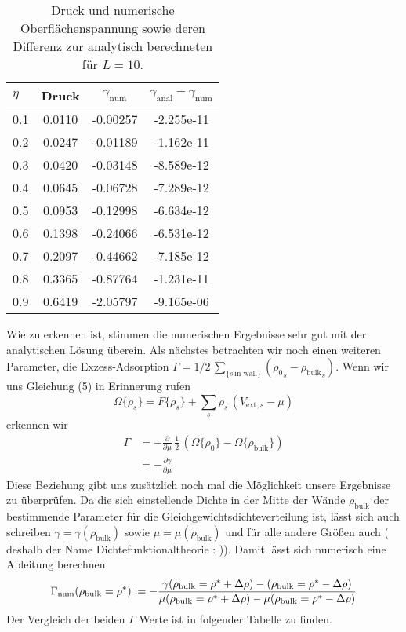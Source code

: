 \documentclass[12pt]{article}
\begin{document}
\begin{table}[H]\centering\begin{tabular}{l | c | c | c}
$\eta$&Druck&$\gamma_\text{num}$&$\gamma_\text{anal}-\gamma_\text{num}$\\\hline\hline
0.1&0.0110&-0.00257&-2.255e-11\\
0.2&0.0247&-0.01189&-1.162e-11\\
0.3&0.0420&-0.03148&-8.589e-12\\
0.4&0.0645&-0.06728&-7.289e-12\\
0.5&0.0953&-0.12998&-6.634e-12\\
0.6&0.1398&-0.24066&-6.531e-12\\
0.7&0.2097&-0.44662&-7.185e-12\\
0.8&0.3365&-0.87764&-1.231e-11\\
0.9&0.6419&-2.05797&-9.165e-06
\end{tabular}\caption{Druck und numerische Oberflächenspannung sowie deren Differenz zur analytisch berechneten für $L=10$.}\end{table}
Wie zu erkennen ist, stimmen die numerischen Ergebnisse sehr gut mit der analytischen Lösung überein.\newline\newline
Als nächstes betrachten wir noch einen weiteren Parameter, die Exzess-Adsorption $\Gamma=1/2\,\sum_{\{s\,\text{in wall}\}}({\rho_0}_s-{\rho_\text{bulk}}_s)$. Wenn wir uns Gleichung (5) in Erinnerung rufen
\begin{equation*}\Omega\{\rho_s\}=F\{\rho_s\}+\sum_s\rho_s\,(V_{\text{ext},s}-\mu)\end{equation*}
erkennen wir
\begin{align*}\Gamma&=-\frac{\partial}{\partial\mu}\,\frac{1}{2}\,(\Omega\{\rho_0\}-\Omega\{\rho_\text{bulk}\})\\
&=-\frac{\partial\gamma}{\partial\mu}\end{align*}
Diese Beziehung gibt uns zusätzlich noch mal die Möglichkeit unsere Ergebnisse zu überprüfen. Da die sich einstellende Dichte in der Mitte der Wände $\rho_\text{bulk}$ der bestimmende Parameter für die Gleichgewichtsdichteverteilung ist, lässt sich auch schreiben $\gamma=\gamma(\rho_\text{bulk})$ sowie $\mu=\mu(\rho_\text{bulk})$ und für alle andere Größen auch ( deshalb der Name Dichtefunktionaltheorie : )). Damit lässt sich numerisch eine Ableitung berechnen
\begin{align*}\Gamma_\text{num}(\rho_\text{bulk}=\rho^*)\vcentcolon=-\frac{\gamma(\rho_\text{bulk}=\rho^*+\Delta\rho)-(\rho_\text{bulk}=\rho^*-\Delta\rho)}{\mu(\rho_\text{bulk}=\rho^*+\Delta\rho)-\mu(\rho_\text{bulk}=\rho^*-\Delta\rho)}\end{align*}
Der Vergleich der beiden $\Gamma$ Werte ist in folgender Tabelle zu finden.
\end{document}
